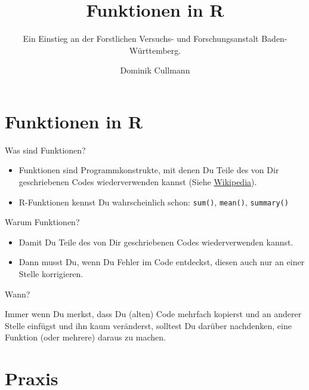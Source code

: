 \documentclass[ignorenonframetext,]{beamer}
\title{Funktionen in \textbf{R}}
\subtitle{Ein Einstieg an der Forstlichen Versuchs- und Forschungsanstalt
Baden-Württemberg.}
\author{Dominik Cullmann}
\date{}
\providecommand{\tightlist}{%
  \setlength{\itemsep}{0pt}\setlength{\parskip}{0pt}}
\begin{document}
\frame{\titlepage}

\section{Funktionen in R}\label{funktionen-in-r}

\begin{frame}[fragile]{Was sind Funktionen?}

\begin{itemize}
\tightlist
\item
  Funktionen sind Programmkonstrukte, mit denen Du Teile des von Dir
  geschriebenen Codes wiederverwenden kannst (Siehe
  \href{https://de.wikipedia.org/wiki/Funktion_(Programmierung)}{Wikipedia}).
\item
  R-Funktionen kennst Du wahrscheinlich schon: \texttt{sum()},
  \texttt{mean()}, \texttt{summary()}
\end{itemize}

\end{frame}

\begin{frame}{Warum Funktionen?}

\begin{itemize}
\tightlist
\item
  Damit Du Teile des von Dir geschriebenen Codes wiederverwenden kannst.
\item
  Dann musst Du, wenn Du Fehler im Code entdeckst, diesen auch nur an
  einer Stelle korrigieren.
\end{itemize}

\begin{block}{Wann?}

Immer wenn Du merkst, dass Du (alten) Code mehrfach kopierst und an
anderer Stelle einfügst und ihn kaum veränderst, solltest Du darüber
nachdenken, eine Funktion (oder mehrere) daraus zu machen.

\end{block}

\end{frame}

\section{Praxis}\label{praxis}
\end{document}
